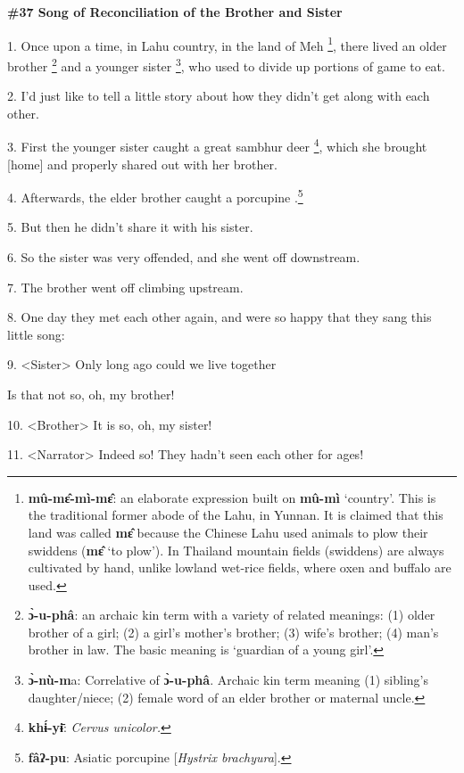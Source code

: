 
\textbf{\#37 Song of Reconciliation of the Brother and Sister}

1. Once upon a time, in Lahu country, in the land of Meh \footnote{\textbf{mû-mɛ̂-mì-mɛ̂}: an elaborate expression built on \textbf{mû-mì} `country'. This is the traditional former abode of the Lahu, in Yunnan. It is claimed that this land was called \textbf{mɛ̂} because the Chinese Lahu used animals to plow their swiddens (\textbf{mɛ̂ }`to plow'). In Thailand mountain fields (swiddens) are always cultivated by hand, unlike lowland wet-rice fields, where oxen and buffalo are used.}, there lived an older
brother \footnote{\textbf{ ɔ̀-u-phâ}: an archaic kin term with a variety of related meanings: (1) older brother of a girl; (2) a girl's mother's brother; (3) wife's brother; (4) man's brother in law.  The basic meaning is `guardian of a young girl'.} and a younger sister \footnote{\textbf{ɔ̀-nù-m}a: Correlative of \textbf{ɔ̀-u-phâ}. Archaic kin term meaning (1) sibling's daughter/niece; (2) female word of an elder brother or maternal uncle.}, who used to divide up portions of game to
eat.

2. I'd just like to tell a little story about how they didn't get along with each
other.

3. First the younger sister caught a great sambhur deer \footnote{\textbf{khɨ́-yɨ̄}: \textit{Cervus unicolor.}}, which she brought
[home] and properly shared out with her brother.

4. Afterwards, the elder brother caught a porcupine .\footnote{\textbf{fâʔ-pu}: Asiatic porcupine [\textit{Hystrix brachyura}].}

5. But then he didn't share it with his sister.

6. So the sister was very offended, and she went off downstream.

7. The brother went off climbing upstream.

8. One day they met each other again, and were so happy that they sang this little
song:

9. <Sister> Only long ago could we live together

Is that not so, oh, my brother!

10. <Brother> It is so, oh, my sister!

11. <Narrator> Indeed so! They hadn't seen each other for ages!
